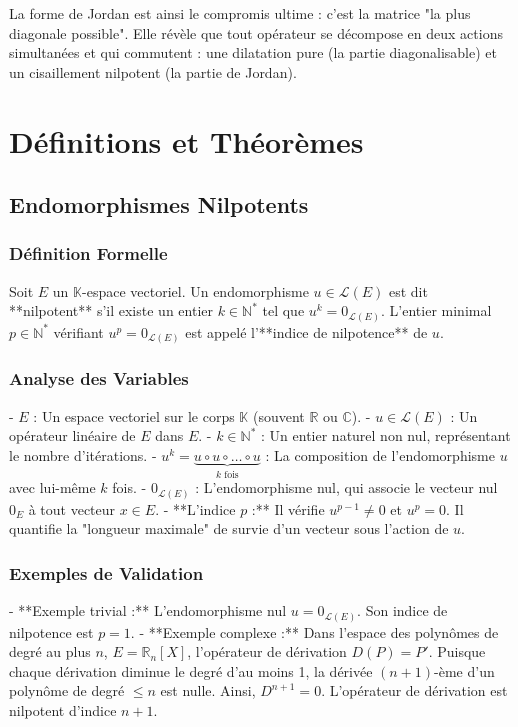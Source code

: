 \documentclass[11pt,a4paper]{article}
\begin{document}
La forme de Jordan est ainsi le compromis ultime : c'est la matrice "la plus diagonale possible". Elle révèle que tout opérateur se décompose en deux actions simultanées et qui commutent : une dilatation pure (la partie diagonalisable) et un cisaillement nilpotent (la partie de Jordan).

\section{Définitions et Théorèmes}

\subsection{Endomorphismes Nilpotents}

\subsubsection{Définition Formelle}
Soit $E$ un $\mathbb{K}$-espace vectoriel. Un endomorphisme $u \in \mathcal{L}(E)$ est dit **nilpotent** s'il existe un entier $k \in \mathbb{N}^*$ tel que $u^k = 0_{\mathcal{L}(E)}$. L'entier minimal $p \in \mathbb{N}^*$ vérifiant $u^p = 0_{\mathcal{L}(E)}$ est appelé l'**indice de nilpotence** de $u$.

\subsubsection{Analyse des Variables}
- $E$ : Un espace vectoriel sur le corps $\mathbb{K}$ (souvent $\mathbb{R}$ ou $\mathbb{C}$).
- $u \in \mathcal{L}(E)$ : Un opérateur linéaire de $E$ dans $E$.
- $k \in \mathbb{N}^*$ : Un entier naturel non nul, représentant le nombre d'itérations.
- $u^k = \underbrace{u \circ u \circ \dots \circ u}_{k \text{ fois}}$ : La composition de l'endomorphisme $u$ avec lui-même $k$ fois.
- $0_{\mathcal{L}(E)}$ : L'endomorphisme nul, qui associe le vecteur nul $0_E$ à tout vecteur $x \in E$.
- **L'indice $p$ :** Il vérifie $u^{p-1} \neq 0$ et $u^p = 0$. Il quantifie la "longueur maximale" de survie d'un vecteur sous l'action de $u$.

\subsubsection{Exemples de Validation}
- **Exemple trivial :** L'endomorphisme nul $u = 0_{\mathcal{L}(E)}$. Son indice de nilpotence est $p=1$.
- **Exemple complexe :** Dans l'espace des polynômes de degré au plus $n$, $E = \mathbb{R}_n[X]$, l'opérateur de dérivation $D(P) = P'$. Puisque chaque dérivation diminue le degré d'au moins 1, la dérivée $(n+1)$-ème d'un polynôme de degré $\leq n$ est nulle. Ainsi, $D^{n+1} = 0$. L'opérateur de dérivation est nilpotent d'indice $n+1$.
\end{document}
